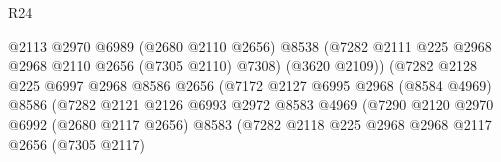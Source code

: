 \begin{lexlean}{R24}
\begin{coremodule}
                                            @2113
                                            @2970
                                            @6989
                                            (@2680 @2110 @2656)
                                            @8538
                                            (@7282
                                              @2111
                                              @225
                                              @2968
                                              @2968
                                              @2110
                                              @2656
                                              (@7305 @2110)
                                              @7308)
                                            (@3620 @2109))
                                          (@7282
                                            @2128
                                            @225
                                            @6997
                                            @2968
                                            @8586
                                            @2656
                                            (@7172
                                              @2127
                                              @6995
                                              @2968
                                              (@8584 @4969)
                                              @8586
                                              (@7282
                                                @2121
                                                @2126
                                                @6993
                                                @2972
                                                @8583
                                                @4969
                                                (@7290
                                                  @2120
                                                  @2970
                                                  @6992
                                                  (@2680 @2117 @2656)
                                                  @8583
                                                  (@7282
                                                    @2118
                                                    @225
                                                    @2968
                                                    @2968
                                                    @2117
                                                    @2656
                                                    (@7305 @2117)

\end{coremodule}
\end{lexlean}
